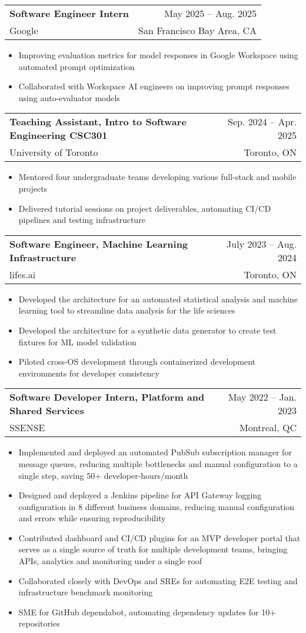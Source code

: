 \documentclass[letterpaper,11pt]{article}
\makeatletter
\newcommand{\resumeItem}[1]{
  \item\small{
    {#1 \vspace{-2pt}}
  }
}
\newcommand{\resumeSubheading}[4]{
  \vspace{-2pt}\item
    \begin{tabular*}{0.97\textwidth}[t]{l@{\extracolsep{\fill}}r}
      \textbf{#1} & #2 \\
      \small{#3} & \small{#4} \\
    \end{tabular*}\vspace{-7pt}
}
\newcommand{\resumeSubSubheading}[2]{
    \item
    \begin{tabular*}{0.97\textwidth}{l@{\extracolsep{\fill}}r}
      \textit{\small#1} & \small #2 \\
    \end{tabular*}\vspace{-7pt}
}
\newcommand{\resumeSubHeadingListEnd}{\end{itemize}}
\newcommand{\resumeItemListStart}{\begin{itemize}}
\newcommand{\resumeItemListEnd}{\end{itemize}\vspace{-5pt}}
\makeatother
\begin{document}
    \resumeSubheading
      {Software Engineer Intern}{May 2025 -- Aug. 2025}
      {Google}{San Francisco Bay Area, CA}
      \resumeItemListStart
        \resumeItem{Improving evaluation metrics for model responses in Google Workspace using automated prompt optimization}
        \resumeItem{Collaborated with Workspace AI engineers on improving prompt responses using auto-evaluator models}
      \resumeItemListEnd

    \resumeSubheading
      {Teaching Assistant, Intro to Software Engineering CSC301}{Sep. 2024 -- Apr. 2025}
      {University of Toronto}{Toronto, ON}
      \resumeItemListStart
        \resumeItem{Mentored four undergraduate teams developing various full-stack and mobile projects}
        \resumeItem{Delivered tutorial sessions on project deliverables, automating CI/CD pipelines and testing infrastructure}
      \resumeItemListEnd
      

    \resumeSubheading
      {Software Engineer, Machine Learning Infrastructure}{July 2023 -- Aug. 2024}
      {lifes.ai}{Toronto, ON}
      \resumeItemListStart
        \resumeItem{Developed the architecture for an automated statistical analysis and machine learning tool to streamline data analysis for the life sciences}
        \resumeItem{Developed the architecture for a synthetic data generator to create test fixtures for ML model validation}
        \resumeItem{Piloted cross-OS development through containerized development environments for developer consistency}
    \resumeItemListEnd

    \resumeSubheading
      {Software Developer Intern, Platform and Shared Services}{May 2022 -- Jan. 2023}
      {SSENSE}{Montreal, QC}
      \resumeItemListStart
        \resumeItem{Implemented and deployed an automated PubSub subscription manager for message queues, reducing multiple bottlenecks and manual configuration to a single step, saving 50+ developer-hours/month}
        \resumeItem{Designed and deployed a Jenkins pipeline for API Gateway logging configuration in 8 different business domains, reducing manual configuration and errors while ensuring reproducibility}
        \resumeItem{Contributed dashboard and CI/CD plugins for an MVP developer portal that serves as a single source of truth for multiple development teams, bringing APIs, analytics and monitoring under a single roof}
        \resumeItem{Collaborated closely with DevOps and SREs for automating E2E testing and infrastructure benchmark monitoring}
        \resumeItem{SME for GitHub dependabot, automating dependency updates for 10+ repositories}
      \resumeItemListEnd
    
\end{document}
